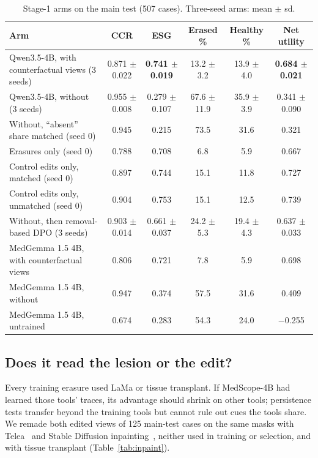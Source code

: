 \documentclass[11pt]{article}
\newcommand{\best}[1]{\textbf{#1}}
\begin{document}
\begin{table}[t]
\centering\footnotesize\setlength{\tabcolsep}{4pt}
\caption{Stage-1 arms on the main test (507 cases). Three-seed arms: mean $\pm$ sd.}
\label{tab:ablation}
\begin{tabular}{lccccc}
\toprule
Arm & CCR & ESG & Erased \% & Healthy \% & Net utility \\
\midrule
Qwen3.5-4B, with counterfactual views (3 seeds) & 0.871 $\pm$ 0.022 & \best{0.741 $\pm$ 0.019} & 13.2 $\pm$ 3.2 & 13.9 $\pm$ 4.0 & \best{0.684 $\pm$ 0.021} \\
Qwen3.5-4B, without (3 seeds) & 0.955 $\pm$ 0.008 & 0.279 $\pm$ 0.107 & 67.6 $\pm$ 11.9 & 35.9 $\pm$ 3.9 & 0.341 $\pm$ 0.090 \\
Without, ``absent'' share matched (seed 0) & 0.945 & 0.215 & 73.5 & 31.6 & 0.321 \\
Erasures only (seed 0) & 0.788 & 0.708 & 6.8 & 5.9 & 0.667 \\
Control edits only, matched (seed 0) & 0.897 & 0.744 & 15.1 & 11.8 & 0.727 \\
Control edits only, unmatched (seed 0) & 0.904 & 0.753 & 15.1 & 12.5 & 0.739 \\
Without, then removal-based DPO (3 seeds) & 0.903 $\pm$ 0.014 & 0.661 $\pm$ 0.037 & 24.2 $\pm$ 5.3 & 19.4 $\pm$ 4.3 & 0.637 $\pm$ 0.033 \\
\midrule
MedGemma 1.5 4B, with counterfactual views & 0.806 & 0.721 & 7.8 & 5.9 & 0.698 \\
MedGemma 1.5 4B, without & 0.947 & 0.374 & 57.5 & 31.6 & 0.409 \\
MedGemma 1.5 4B, untrained & 0.674 & 0.283 & 54.3 & 24.0 & $-$0.255 \\
\bottomrule
\end{tabular}
\end{table}

\subsection{Does it read the lesion or the edit?}\label{sec:edit}
Every training erasure used LaMa or tissue transplant. If MedScope-4B had learned those tools' traces, its advantage should shrink on other tools; persistence tests transfer beyond the training tools but cannot rule out cues the tools share. We remade both edited views of 125 main-test cases on the same masks with Telea~\cite{telea} and Stable Diffusion inpainting~\cite{ldm}, neither used in training or selection, and with tissue transplant (Table~\ref{tab:inpaint}).
\end{document}
